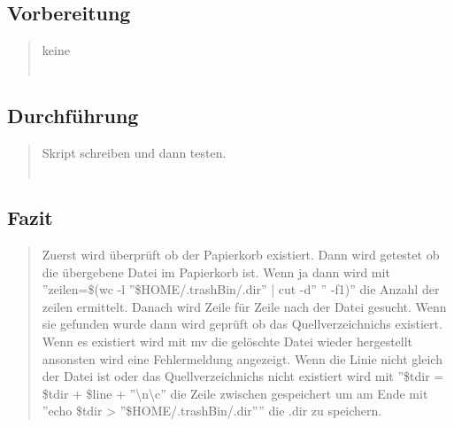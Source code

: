 	\subsection{Vorbereitung}
		\begin{quote}
			keine\\ \\
		\end{quote}
	\subsection{Durchführung}
		\begin{quote}
			Skript schreiben und dann testen.\\ \\
		\end{quote}
	\subsection{Fazit}
		\begin{quote}
			Zuerst wird \"uberpr\"uft ob der Papierkorb existiert. Dann wird getestet ob die \"ubergebene Datei im Papierkorb ist.
			Wenn ja  dann wird mit ''zeilen=\$(wc -l ''\$HOME/.trashBin/.dir'' | cut -d'' '' -f1)'' die Anzahl der zeilen ermittelt.
			Danach wird Zeile f\"ur Zeile nach der Datei gesucht.
			Wenn sie gefunden wurde dann wird gepr\"uft ob das Quellverzeichnichs existiert. Wenn es existiert wird mit mv die gel\"oschte Datei wieder hergestellt ansonsten wird eine Fehlermeldung angezeigt.
			Wenn die Linie nicht gleich der Datei ist oder das Quellverzeichnichs nicht existiert wird mit ''\$tdir = \$tdir + \$line + ''\textbackslash n\textbackslash c'' die Zeile zwischen gespeichert um am Ende mit
			''echo \$tdir > ''\$HOME/.trashBin/.dir'''' die .dir zu speichern.
			
		\end{quote}

